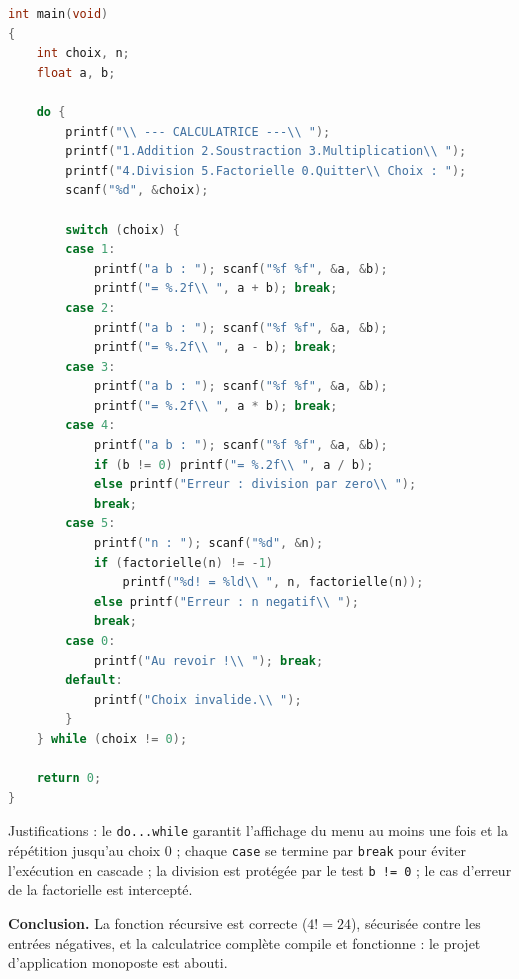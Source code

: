\documentclass[11pt]{article}
\begin{document}
\begin{exoresolu}
\begin{lstlisting}[language=C]
int main(void)
{
    int choix, n;
    float a, b;

    do {
        printf("\\ --- CALCULATRICE ---\\ ");
        printf("1.Addition 2.Soustraction 3.Multiplication\\ ");
        printf("4.Division 5.Factorielle 0.Quitter\\ Choix : ");
        scanf("%d", &choix);

        switch (choix) {
        case 1:
            printf("a b : "); scanf("%f %f", &a, &b);
            printf("= %.2f\\ ", a + b); break;
        case 2:
            printf("a b : "); scanf("%f %f", &a, &b);
            printf("= %.2f\\ ", a - b); break;
        case 3:
            printf("a b : "); scanf("%f %f", &a, &b);
            printf("= %.2f\\ ", a * b); break;
        case 4:
            printf("a b : "); scanf("%f %f", &a, &b);
            if (b != 0) printf("= %.2f\\ ", a / b);
            else printf("Erreur : division par zero\\ ");
            break;
        case 5:
            printf("n : "); scanf("%d", &n);
            if (factorielle(n) != -1)
                printf("%d! = %ld\\ ", n, factorielle(n));
            else printf("Erreur : n negatif\\ ");
            break;
        case 0:
            printf("Au revoir !\\ "); break;
        default:
            printf("Choix invalide.\\ ");
        }
    } while (choix != 0);

    return 0;
}
\end{lstlisting}
Justifications : le \texttt{do...while} garantit l'affichage du menu au moins une fois et la répétition jusqu'au choix 0 ; chaque \texttt{case} se termine par \texttt{break} pour éviter l'exécution en cascade ; la division est protégée par le test \texttt{b != 0} ; le cas d'erreur de la factorielle est intercepté.

\textbf{Conclusion.} La fonction récursive est correcte ($4! = 24$), sécurisée contre les entrées négatives, et la calculatrice complète compile et fonctionne : le projet d'application monoposte est abouti.
\end{exoresolu}
\end{document}
